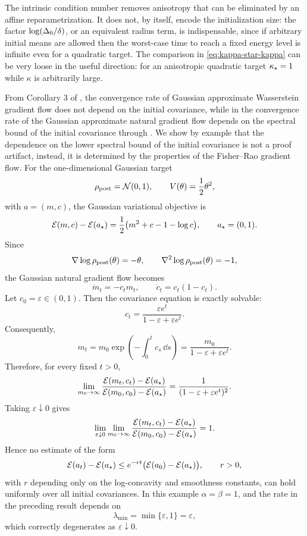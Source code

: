 The intrinsic condition number removes anisotropy that can be eliminated by an affine
reparametrization. It does not, by itself, encode the initialization size: the factor
$\log(\Delta_0/\delta)$, or an equivalent radius term, is indispensable, since if
arbitrary initial means are allowed then the worst-case time to reach a fixed energy level
is infinite even for a quadratic target. The comparison in \eqref{eq:kappa-star-kappa} can
be very loose in the useful direction: for an anisotropic quadratic target
$\kappa_\star=1$ while $\kappa$ is arbitrarily large.

\begin{remark}
\label{rem:FR-init-cov}
From Corollary 3 of \citet{lambert2022variational}, the convergence rate of Gaussian
approximate Wasserstein gradient flow does not depend on the initial covariance, while in
 the convergence rate of the Gaussian approximate natural gradient flow
depends on the spectral bound of the initial covariance through .
We show by example that the dependence on the lower spectral bound of the initial covariance is
not a proof artifact, instead, it is determined by the properties of the Fisher--Rao gradient
flow. For the one-dimensional Gaussian target
\[
    \rho_{\mathrm{post}}=\mathcal{N}(0,1),
    \qquad
    V(\theta)=\frac12\theta^2,
\]
with $a=(m,c)$, the Gaussian variational objective is
\[
    \mathcal{E}(m,c)-\mathcal{E}(a_\star)
    =
    \frac12\bigl(m^2+c-1-\log c\bigr),
    \qquad
    a_\star=(0,1).
\]
Since
\[
    \nabla\log\rho_{\mathrm{post}}(\theta)=-\theta,
    \qquad
    \nabla^2\log\rho_{\mathrm{post}}(\theta)=-1,
\]
the Gaussian natural gradient flow becomes
\[
    \dot m_t=-c_tm_t,
    \qquad
    \dot c_t=c_t(1-c_t).
\]
Let $c_0=\varepsilon\in(0,1)$. Then the covariance equation is exactly solvable:
\[
    c_t=\frac{\varepsilon e^t}{1-\varepsilon+\varepsilon e^t}.
\]
Consequently,
\[
    m_t
    =
    m_0\exp\left(-\int_0^tc_s\,\dd s\right)
    =
    \frac{m_0}{1-\varepsilon+\varepsilon e^t}.
\]
Therefore, for every fixed $t>0$,
\[
    \lim_{m_0\to\infty}
    \frac{\mathcal{E}(m_t,c_t)-\mathcal{E}(a_\star)}{\mathcal{E}(m_0,c_0)-\mathcal{E}(a_\star)}
    =
    \frac1{(1-\varepsilon+\varepsilon e^t)^2}.
\]
Taking $\varepsilon\downarrow0$ gives
\[
    \lim_{\varepsilon\downarrow0}\lim_{m_0\to\infty}
    \frac{\mathcal{E}(m_t,c_t)-\mathcal{E}(a_\star)}{\mathcal{E}(m_0,c_0)-\mathcal{E}(a_\star)}
    =1 .
\]
Hence no estimate of the form
\[
    \mathcal{E}(a_t)-\mathcal{E}(a_\star)
    \leq
    e^{-rt}\bigl(\mathcal{E}(a_0)-\mathcal{E}(a_\star)\bigr),
    \qquad r>0,
\]
with $r$ depending only on the log-concavity and smoothness constants, can hold uniformly over
all initial covariances. In this example $\alpha=\beta=1$, and the rate in the preceding result
depends on
\[
    \lambda_{\min}=\min\{\varepsilon,1\}=\varepsilon,
\]
which correctly degenerates as $\varepsilon\downarrow0$.


\end{remark}
